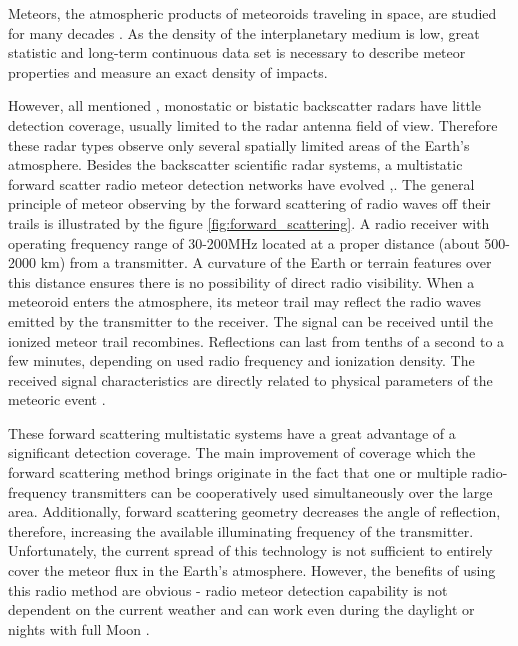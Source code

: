 \documentclass[twoside]{ctuthesis}
\theoremstyle{plain}
\theoremstyle{definition}
\theoremstyle{note}
\begin{document}
Meteors, the atmospheric products of meteoroids traveling in space, are studied for many decades \cite{interplanetary_medium}. As the density of the interplanetary medium is low, great statistic and long-term continuous data set is necessary to describe meteor properties and measure an exact density of impacts.

However, all mentioned  \cite{skiymet},\cite{CMOR_radar}  monostatic or bistatic backscatter radars have little detection coverage, usually limited to the radar antenna field of view. Therefore these radar types observe only several spatially limited areas of the Earth's atmosphere.
Besides the backscatter scientific radar systems, a multistatic forward scatter radio meteor detection networks have evolved \cite{BRAMS},\cite{RETRAM}.
The general principle of meteor observing by the forward scattering of radio waves off their trails is illustrated by the figure \ref{fig:forward_scattering}. A radio receiver with operating frequency range of 30-200MHz located at a proper distance (about 500-2000 km) from a transmitter. A curvature of the Earth or terrain features over this distance ensures there is no possibility of direct radio visibility. When a meteoroid enters the atmosphere, its meteor trail may reflect the radio waves emitted by the transmitter to the receiver. The signal can be received until the ionized meteor trail recombines. Reflections can last from tenths of a second to a few minutes, depending on used radio frequency and ionization density. The received signal characteristics are directly related to physical parameters of the meteoric event \cite{forward_scatter}.

These forward scattering multistatic systems have a great advantage of a significant detection coverage. 
The main improvement of coverage which the forward scattering method brings originate in the fact that one or multiple radio-frequency transmitters can be cooperatively used simultaneously over the large area. Additionally, forward scattering geometry decreases the angle of reflection, therefore, increasing the available illuminating frequency of the transmitter. Unfortunately, the current spread of this technology is not sufficient to entirely cover the meteor flux in the Earth's atmosphere.
 However, the benefits of using this radio method are obvious - radio meteor detection capability is not dependent on the current weather and can work even during the daylight or nights with full Moon \cite{daylight_shover}.
\end{document}
